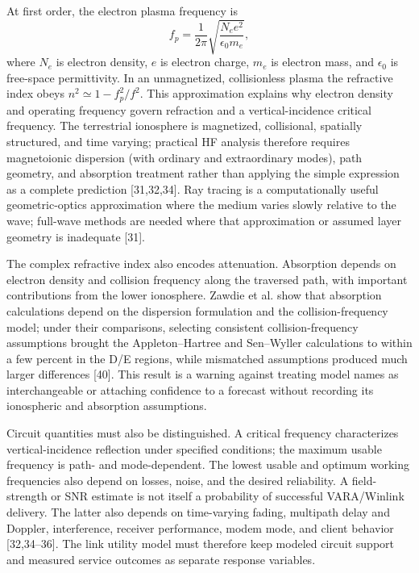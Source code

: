 \documentclass[11pt,a4paper]{article}
\begin{document}
At first order, the electron plasma frequency is
\[
  f_p = \frac{1}{2\pi}\sqrt{\frac{N_e e^2}{\epsilon_0 m_e}},
\]
where \(N_e\) is electron density, \(e\) is electron charge, \(m_e\) is
electron mass, and \(\epsilon_0\) is free-space permittivity. In an
unmagnetized, collisionless plasma the refractive index obeys
\(n^2 \simeq 1-f_p^2/f^2\). This approximation explains why electron density
and operating frequency govern refraction and a vertical-incidence critical
frequency. The terrestrial ionosphere is magnetized, collisional, spatially
structured, and time varying; practical HF analysis therefore requires
magnetoionic dispersion (with ordinary and extraordinary modes), path geometry,
and absorption treatment rather than applying the simple expression as a
complete prediction [31,32,34]. Ray tracing is a computationally useful
geometric-optics approximation where the medium varies slowly relative to the
wave; full-wave methods are needed where that approximation or assumed layer
geometry is inadequate [31].

The complex refractive index also encodes attenuation. Absorption depends on
electron density and collision frequency along the traversed path, with
important contributions from the lower ionosphere. Zawdie et al. show that
absorption calculations depend on the dispersion formulation and the
collision-frequency model; under their comparisons, selecting consistent
collision-frequency assumptions brought the Appleton--Hartree and Sen--Wyller
calculations to within a few percent in the D/E regions, while mismatched
assumptions produced much larger differences [40]. This result is a warning
against treating model names as interchangeable or attaching confidence to a
forecast without recording its ionospheric and absorption assumptions.

Circuit quantities must also be distinguished. A critical frequency
characterizes vertical-incidence reflection under specified conditions; the
maximum usable frequency is path- and mode-dependent. The lowest usable and
optimum working frequencies also depend on losses, noise, and the desired
reliability. A field-strength or SNR estimate is not itself a probability of
successful VARA/Winlink delivery. The latter also depends on time-varying
fading, multipath delay and Doppler, interference, receiver performance,
modem mode, and client behavior [32,34--36]. The link utility model must
therefore keep modeled circuit support and measured service outcomes as
separate response variables.
\end{document}
